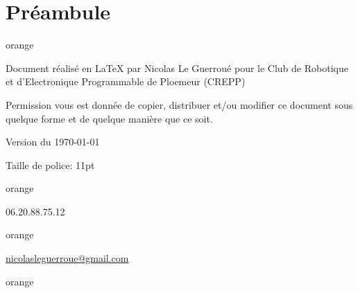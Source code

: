 
\chapter{Préambule}
\begin{items}{orange}{\Triangle}
    \item Document réalisé en \LaTeX{} par Nicolas Le Guerroué 
    pour le Club de Robotique et d'Electronique Programmable de Ploemeur (CREPP) 
    \item Permission vous est donnée de copier, distribuer et/ou modifier ce document sous quelque forme et de quelque manière que ce soit.
    \item Version du \today
    \item Taille de police: 11pt
    \end{items}
    
    
    \begin{items}{orange}{\faPhone}
        \item 06.20.88.75.12
    \end{items}
    
    \begin{items}{orange}{\faEnvelope}
        \item \href{mailto:nicolasleguerroue@gmail.com}{nicolasleguerroue@gmail.com}
    \end{items}
    

    \begin{items}{orange}{\Triangle}
        \item {}
    \end{items}
    